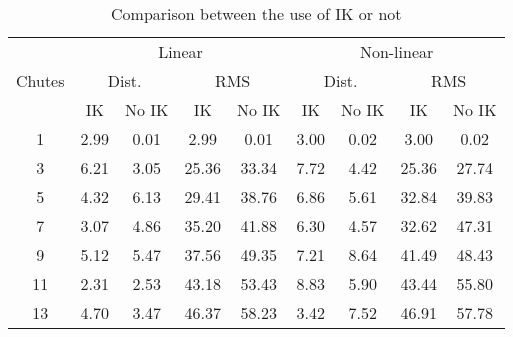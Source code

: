 \documentclass[11pt, a4paper]{article}
\begin{document}
\begin{table*}[]
  \caption{Comparison between the use of IK or not}
  \centering
  \begin{tabular}{ccccc|cccc}
  \hline
  & \multicolumn{4}{c}{Linear} & \multicolumn{4}{c}{Non-linear}\\
  \multicolumn{1}{c}{Chutes} & \multicolumn{2}{c}{Dist.} & \multicolumn{2}{c}{RMS} & \multicolumn{2}{c}{Dist.} & \multicolumn{2}{c}{RMS}\\
  \multicolumn{1}{l}{}  & IK & No IK & IK & No IK & IK & No IK & IK & No IK \\ \hline
  1   & 2.99 & 0.01 & 2.99 & 0.01 & 3.00 & 0.02 & 3.00 & 0.02  \\
  3   & 6.21 & 3.05 & 25.36 & 33.34 & 7.72 & 4.42 & 25.36 & 27.74 \\
  5   & 4.32 & 6.13 & 29.41 & 38.76 & 6.86 & 5.61 & 32.84 & 39.83 \\
  7   & 3.07 & 4.86 & 35.20 & 41.88 & 6.30 & 4.57 & 32.62 & 47.31 \\
  9   & 5.12 & 5.47 & 37.56 & 49.35 & 7.21 & 8.64 & 41.49 & 48.43 \\
  11  & 2.31 & 2.53 & 43.18 & 53.43 & 8.83 & 5.90 & 43.44 & 55.80 \\
  13  & 4.70 & 3.47 & 46.37 & 58.23 & 3.42 & 7.52 & 46.91 & 57.78 \\
  \hline
  \end{tabular}
  \label{IK_comparison}
\end{table*}
  
\end{document}
